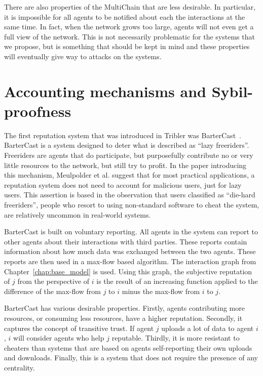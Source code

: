 \documentclass[a4paper,11pt]{book}
\theoremstyle{definition}
\begin{document}
There are also properties of the MultiChain that are less desirable. In particular, it is impossible
for all agents to be notified about each the interactions at the same time. 
In fact, when the network grows too large,
agents will not even get a full view of the network. This is not necessarily problematic for the systems
that we propose, but is something that should be kept in mind and these properties will eventually
give way to attacks on the systems. 


\chapter{Accounting mechanisms and Sybil-proofness}
\label{chap:netflow}

The first reputation system that was introduced in Tribler was BarterCast~\cite{meulpolder2009bartercast}.
BarterCast is a system designed to deter what is described as ``lazy freeriders''.
Freeriders are agents that do participate, but purposefully contribute no or very little
resources to the network, but still try to profit.
In the paper introducing this mechanism, Meulpolder et al. suggest that for most practical applications, 
a reputation system does not
need to account for malicious users, just for lazy users. This assertion is based in the observation
that users classified as ``die-hard freeriders'', people who resort to using non-standard software to
cheat the system, are relatively uncommon in real-world systems. 

BarterCast is built on voluntary reporting. All agents in the system can report to other agents
about their interactions with third parties. These reports contain information about how much data
was exchanged between the two agents. These reports are then used in a max-flow based algorithm.
The interaction graph from Chapter~\ref{chap:base_model} is used.
Using this graph, the subjective reputation of $j$ from the perspective
of $i$ is the result of an increasing function applied to the difference of the max-flow from $j$ to $i$
minus the max-flow from $i$ to $j$.

BarterCast has various desirable properties. Firstly, agents contributing more resources, or consuming
less resources, have a higher reputation. Secondly, it captures the concept of transitive trust. If agent
$j$ uploads a lot of data to agent $i$, $i$ will consider agents who help $j$ reputable. Thirdly,
it is more resistant to cheaters than systems that are based on agents self-reporting their own uploads and
downloads. Finally, this is a system that does not require the presence of any centrality. 
\end{document}
